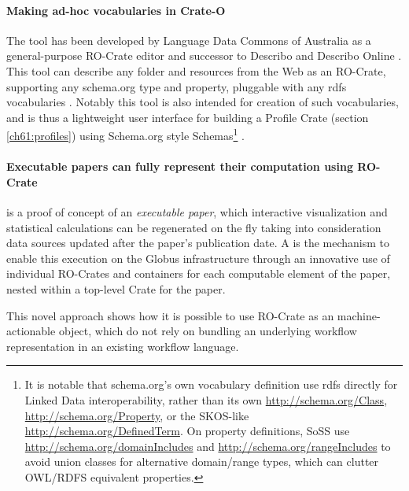 \paragraph{Making ad-hoc vocabularies in Crate-O}\label{ch61:crate-o}
The  tool has been developed by Language Data Commons of Australia  as a general-purpose RO-Crate editor and successor to Describo \cite{La Rosa 2021d} and Describo Online \cite{La Rosa 2021c}. 
This tool can describe any folder and resources from the Web as an RO-Crate, supporting any schema.org type and property, pluggable with any rdfs vocabularies \cite{Guha 2014}. 
Notably this tool is also intended for creation of such vocabularies, and is thus a lightweight user interface for building a Profile Crate (section \vref{ch61:profiles}) using Schema.org style Schemas\footnote{
  It is notable that schema.org's own vocabulary definition use rdfs directly for Linked Data interoperability, 
  rather than its own \url{http://schema.org/Class}, \url{http://schema.org/Property}, or the SKOS-like \url{http://schema.org/DefinedTerm}. 
  On property definitions, SoSS use \url{http://schema.org/domainIncludes} and \url{http://schema.org/rangeIncludes} to avoid union classes for alternative domain/range types, which can clutter OWL/RDFS equivalent properties.} 
.

\paragraph{Executable papers can fully represent their computation using RO-Crate}
\label{ch61:livepublication}

 \cite{Ellerm 2023} is a proof of concept of an \emph{executable paper}, which interactive visualization and statistical calculations can be regenerated on the fly taking into consideration data sources updated after the paper's publication date. A  is the mechanism to enable this execution on the Globus infrastructure through an innovative use of individual RO-Crates and containers for each computable element of the paper, nested within a top-level Crate for the paper.

This novel approach shows how it is possible to use RO-Crate as an machine-actionable object, which do not rely on bundling an underlying workflow representation in an existing workflow language.  

